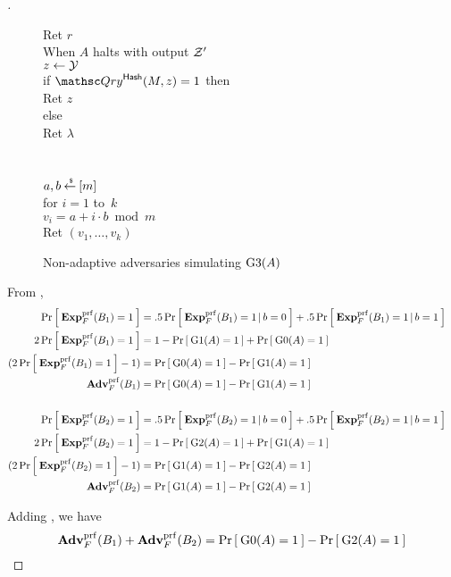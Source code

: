 \begin{proof}[]
\begin{figure}
{{\nudge Ret $r$\\
When $A$ halts with output $\calZ'$\\
\nudge $z \gets \calY$\\
\nudge if $\Qry^{\HashOracle}(M,z)=1$ then\\
\nudge \nudge Ret $z$\\
\nudge else\\
\nudge \nudge Ret $\lambda$\\\\
%
\\
$a,b \getsr [m]$\\
for $i = 1$ to~$k$\\
\nudge $v_i = a+i \cdot b \bmod m$\\
Ret $\left(v_1,\ldots,v_k\right)$
}
}
\caption{Non-adaptive adversaries simulating $\game{3}(A)$} \label{fig:AGame3}
\end{figure}	

%
\noindent
From , %
\begin{align}
\nonumber \Prob{\ExpPRF{F}{B_1} = 1} &= .5\Prob{\ExpPRF{F}{B_1}=1\,|\,b=0} + .5\Prob{\ExpPRF{F}{B_1} = 1\,|\,b=1}\\
\nonumber 2\Prob{\ExpPRF{F}{B_1} = 1} &= 1-\Prob{\game{1}(A)=1} + \Prob{\game{0}(A)=1}\\
\nonumber (2\Prob{\ExpPRF{F}{B_1} = 1} - 1)  &= \Prob{\game{0}(A)=1} - \Prob{\game{1}(A)=1}\\
 \AdvPRF{F}{B_1} &= \Prob{\game{0}(A)=1} - \Prob{\game{1}(A)=1} \label{eq:1}\\
\nonumber& &\\
\nonumber \Prob{\ExpPRF{F}{B_2} = 1} &= .5\Prob{\ExpPRF{F}{B_2}=1\,|\,b=0} + .5\Prob{\ExpPRF{F}{B_2} = 1\,|\,b=1}\\
\nonumber 2\Prob{\ExpPRF{F}{B_2} = 1} &= 1-\Prob{\game{2}(A)=1} + \Prob{\game{1}(A)=1}\\
\nonumber (2\Prob{\ExpPRF{F}{B_2} = 1} - 1)  &= \Prob{\game{1}(A)=1} - \Prob{\game{2}(A)=1}\\
 \AdvPRF{F}{B_2} &= \Prob{\game{1}(A)=1} - \Prob{\game{2}(A)=1} \label{eq:2a}
\end{align}

\noindent
Adding , we have
\begin{equation}
\AdvPRF{F}{B_1} +\AdvPRF{F}{B_2} = \Prob{\game{0}(A)=1} - \Prob{\game{2}(A)=1}\label{eq:2}
\end{equation}


\end{proof}
